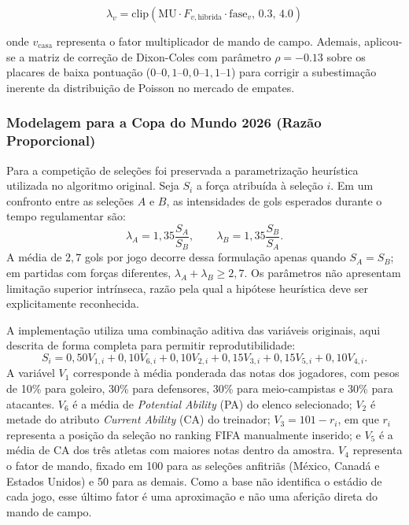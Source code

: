 \documentclass[12pt]{article}
\begin{document}
\begin{equation}
	\lambda_v = \mathrm{clip} \left( \mathrm{MU} \cdot F_{v, \mathrm{hibrida}} \cdot \mathrm{fase}_v, \, 0.3, \, 4.0 \right)
	\label{eq:lambda_visitante}
\end{equation}

onde $v_{\mathrm{casa}}$ representa o fator multiplicador de mando de campo. Ademais, aplicou-se a matriz de correção de Dixon-Coles \cite{dixon1997} com parâmetro $\rho = -0.13$ sobre os placares de baixa pontuação ($0\text{–}0, 1\text{–}0, 0\text{–}1, 1\text{–}1$) para corrigir a subestimação inerente da distribuição de Poisson no mercado de empates.

\subsubsection{Modelagem para a Copa do Mundo 2026 (Razão Proporcional)}

Para a competição de seleções foi preservada a parametrização heurística utilizada no algoritmo original. Seja $S_i$ a força atribuída à seleção $i$. Em um confronto entre as seleções $A$ e $B$, as intensidades de gols esperados durante o tempo regulamentar são:
\begin{equation}
 \lambda_A=1{,}35\frac{S_A}{S_B},\qquad
 \lambda_B=1{,}35\frac{S_B}{S_A}.
 \label{eq:lambdaA_copa}
\end{equation}
A média de $2{,}7$ gols por jogo decorre dessa formulação apenas quando $S_A=S_B$; em partidas com forças diferentes, $\lambda_A+\lambda_B\geq 2{,}7$. Os parâmetros não apresentam limitação superior intrínseca, razão pela qual a hipótese heurística deve ser explicitamente reconhecida.

A implementação utiliza uma combinação aditiva das variáveis originais, aqui descrita de forma completa para permitir reprodutibilidade:
\begin{equation}
 S_i=0{,}50V_{1,i}+0{,}10V_{6,i}+0{,}10V_{2,i}
 +0{,}15V_{3,i}+0{,}15V_{5,i}+0{,}10V_{4,i}.
 \label{eq:score_copa}
\end{equation}
A variável $V_1$ corresponde à média ponderada das notas dos jogadores, com pesos de 10\% para goleiro, 30\% para defensores, 30\% para meio-campistas e 30\% para atacantes. $V_6$ é a média de \textit{Potential Ability} (PA) do elenco selecionado; $V_2$ é metade do atributo \textit{Current Ability} (CA) do treinador; $V_3=101-r_i$, em que $r_i$ representa a posição da seleção no ranking FIFA manualmente inserido; e $V_5$ é a média de CA dos três atletas com maiores notas dentro da amostra. $V_4$ representa o fator de mando, fixado em 100 para as seleções anfitriãs (México, Canadá e Estados Unidos) e 50 para as demais. Como a base não identifica o estádio de cada jogo, esse último fator é uma aproximação e não uma aferição direta do mando de campo.
\end{document}
